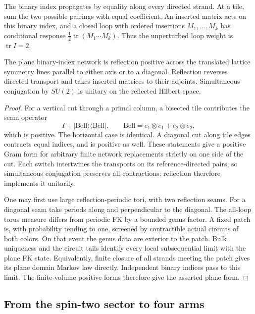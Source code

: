 The binary index propagates by equality along every directed strand.
At a tile, sum the two possible pairings with equal coefficient.
An inserted matrix acts on this binary index, and a closed loop with
ordered insertions $M_1,\ldots,M_k$ has conditional response
$\tfrac12\operatorname{tr}(M_1\cdots M_k)$.  Thus the unperturbed loop
weight is $\operatorname{tr}I=2$.

\begin{lemma}\label{q4field:reflection}
The plane binary-index network is reflection positive across the
translated lattice symmetry lines parallel to either axis or to a
diagonal.  Reflection reverses directed transport and takes inserted
matrices to their adjoints.  Simultaneous conjugation by $SU(2)$ is
unitary on the reflected Hilbert space.
\end{lemma}

\begin{proof}
For a vertical cut through a primal column, a bisected tile contributes
the seam operator
\[
 I+|\mathrm{Bell}\rangle\langle\mathrm{Bell}|,
 \qquad \mathrm{Bell}=e_1\otimes e_1+e_2\otimes e_2,
\]
which is positive.  The horizontal case is identical.  A diagonal cut
along tile edges contracts equal indices, and is positive as well.
These statements give a positive Gram form for arbitrary finite
network replacements strictly on one side of the cut.  Each switch
intertwines the transports on its reference-directed pairs, so
simultaneous conjugation preserves all contractions; reflection
therefore implements it unitarily.

One may first use large reflection-periodic tori, with two reflection
seams.  For a diagonal seam take periods along and perpendicular to the
diagonal.  The all-loop torus measure differs from periodic FK by a
bounded genus factor.  A fixed patch is, with probability tending to
one, screened by contractible actual circuits of both colors.  On that
event the genus data are exterior to the patch.  Bulk uniqueness and
the circuit tails identify every local subsequential limit with the
plane FK state.  Equivalently, finite closure of all strands meeting
the patch gives its plane domain Markov law directly.  Independent
binary indices pass to this limit.  The finite-volume positive forms
therefore give the asserted plane form.
\end{proof}

\subsection{From the spin-two sector to four arms}

